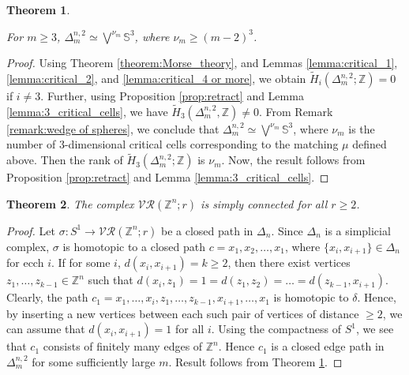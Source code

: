 \documentclass{amsart}
\newtheorem{theorem}{Theorem}[section]
\theoremstyle{definition}
\theoremstyle{remark}
\numberwithin{equation}{section}
\newcommand{\Sp}{\mathbb{S}}
\newcommand{\D}{\Delta}
\newcommand{\vr}[2]{\mathcal{VR}(#1;#2)}
\def\Z{{\mathbb{Z}}}
\begin{document}
\begin{theorem}\label{theorem:finitecase}
	
	For $m \geq 3$, $\D_m^{n,2} \simeq \bigvee^{\nu_m} \Sp^3$, where $\nu_m \geq (m-2)^3$.  
\end{theorem}

\begin{proof}
	Using Theorem \ref{theorem:Morse_theory}, and  Lemmas \ref{lemma:critical_1}, \ref{lemma:critical_2}, and  \ref{lemma:critical_4 or more},  we obtain $\tilde{H}_i(\D_m^{n,2}; \Z) = 0$ if  $i \neq 3$. Further, using Proposition \ref{prop:retract} and Lemma \ref{lemma:3_critical_cells}, we have $\tilde{H}_3(\D_m^{n,2}, \Z) \neq  0$.  From Remark \ref{remark:wedge of spheres}, we conclude that $\D_m^{n,2} \simeq \bigvee^{\nu_m} \Sp^3$, where $\nu_m$ is the number of $3$-dimensional  critical cells corresponding to the matching $\mu$ defined above.  Then   the rank of $\tilde{H}_3(\D_m^{n,2}; \Z)$ is $\nu_m$.  Now, the result follows from  Proposition \ref{prop:retract} and Lemma \ref{lemma:3_critical_cells}. 
\end{proof}



\begin{theorem}\label{theorem:simplyconnected_inside}
	The complex $\vr{\Z^n}{r}$ is simply connected for all $r \geq 2$. 
\end{theorem}

\begin{proof}
	Let $\sigma: S^1 \to \vr{\Z^n}{r}$ be  a  closed path in $\Delta_n$. Since $\Delta_n$ is a simplicial complex, $\sigma$ is  homotopic to a closed path $c= x_1, x_2,\ldots,  x_1$, where  $\{x_i, x_{i+1}\} \in \Delta_n$ for ecch $i$. If for some $i$, $d(x_i, x_{i+1}) =  k \geq 2$, then there exist vertices  $ z_1,  \ldots, z_{k-1} \in \Z^n$ such  that $d(x_i, z_1) = 1 = d(z_1, z_2) = \ldots =  d(z_{k-1}, x_{i+1})$.   Clearly, the path $c_1 = x_1, \ldots, x_i, z_1, \ldots, z_{k-1}, x_{i+1}, \ldots,  x_1$ is homotopic to $\delta$.  Hence, by inserting a new vertices between each such pair of vertices of distance $\geq 2$, we can assume that $d(x_i, x_{i+1}) = 1 $ for all $i$. Using the compactness of $S^1$, we see that $c_1$ consists of finitely many edges of $\Z^n$. Hence $c_1$ is a closed edge path in $\D_m^{n,2}$ for some sufficiently large $m$.  Result follows from Theorem \ref{theorem:finitecase}.
	\end{proof}
\end{document}
